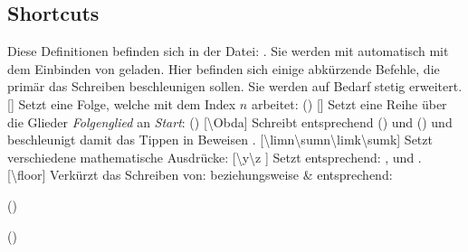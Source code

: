 \subsection[Shortcuts \LILLYxBOXxVersion{\small 1.0.8}]{Shortcuts}
Diese Definitionen befinden sich in der Datei: . Sie werden mit  automatisch mit dem Einbinden von  geladen.\medskip
Hier befinden sich einige abkürzende Befehle, die primär das Schreiben beschleunigen sollen. Sie werden auf Bedarf stetig erweitert.\medskip\newline
%
%
%
[]
Setzt eine Folge, welche mit dem Index $n$ arbeitet:  (\folge)\medskip\newline
%
%
%
[]
Setzt eine Reihe über die Glieder \emph{Folgenglied} an \emph{Start}:  (\reihe)\medskip\newline
%
%
%
[\cmdlist \textbackslash Obda]
Schreibt entsprechend  () und  () und beschleunigt damit das Tippen in Beweisen \Smiley.\medskip\newline
%
%
%
[\cmdlist \textbackslash limn\cmdlist \textbackslash sumn\cmdlist \textbackslash limk\cmdlist \textbackslash sumk]
Setzt verschiedene mathematische Ausdrücke:
%
%
%
[\cmdlist \textbackslash y\cmdlist \textbackslash z \cmdold]
Setzt entsprechend: \x[], \y und \z[].\medskip\newline
%
%
%
[\cmdlist \textbackslash floor]
Verkürzt das Schreiben von:  beziehungsweise  \&  entsprechend:
\begin{multicols}{2}%
    \begin{ditemize}
        \item {} ()%
        \item {} ()%
    \end{ditemize}
\end{multicols}


